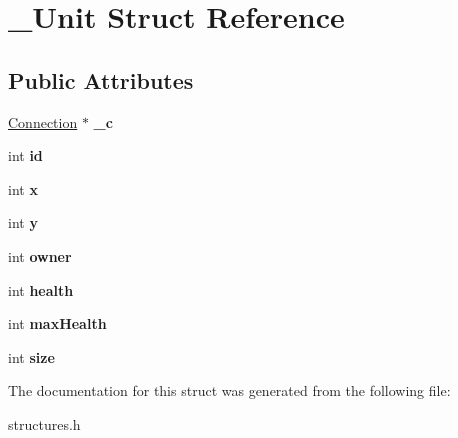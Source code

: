 \hypertarget{struct__Unit}{
\section{\_\-Unit Struct Reference}
\label{struct__Unit}
}
\subsection*{Public Attributes}
\begin{DoxyCompactItemize}
\item 
\hypertarget{struct__Unit_a729acb5ce5ecd34e84fb1fabeb6364c6}{
\hyperlink{structConnection}{Connection} $\ast$ {\bfseries \_\-c}}
\label{struct__Unit_a729acb5ce5ecd34e84fb1fabeb6364c6}

\item 
\hypertarget{struct__Unit_a8395169ce430524ffcb26f2817a8ed23}{
int {\bfseries id}}
\label{struct__Unit_a8395169ce430524ffcb26f2817a8ed23}

\item 
\hypertarget{struct__Unit_a33217a3b609094499a3dd244321169f5}{
int {\bfseries x}}
\label{struct__Unit_a33217a3b609094499a3dd244321169f5}

\item 
\hypertarget{struct__Unit_a6e980439f90bee7cafd90d4cff216a83}{
int {\bfseries y}}
\label{struct__Unit_a6e980439f90bee7cafd90d4cff216a83}

\item 
\hypertarget{struct__Unit_a973dc9bea8c26bcf1163f1a7daa9c68f}{
int {\bfseries owner}}
\label{struct__Unit_a973dc9bea8c26bcf1163f1a7daa9c68f}

\item 
\hypertarget{struct__Unit_ae319ad09267b5fffdab8e525b4962234}{
int {\bfseries health}}
\label{struct__Unit_ae319ad09267b5fffdab8e525b4962234}

\item 
\hypertarget{struct__Unit_afd2ca790b41351e7403c9bc8ec13bc75}{
int {\bfseries maxHealth}}
\label{struct__Unit_afd2ca790b41351e7403c9bc8ec13bc75}

\item 
\hypertarget{struct__Unit_a58d4777d69421eea0112193d07990aa9}{
int {\bfseries size}}
\label{struct__Unit_a58d4777d69421eea0112193d07990aa9}

\end{DoxyCompactItemize}


The documentation for this struct was generated from the following file:\begin{DoxyCompactItemize}
\item 
structures.h\end{DoxyCompactItemize}
